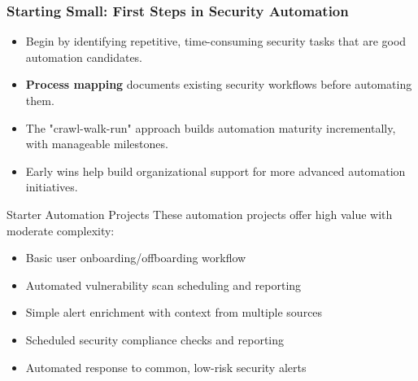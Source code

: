 \documentclass{beamer}
\begin{document}
\begin{frame}
  \frametitle{Starting Small: First Steps in Security Automation}
  
  \begin{itemize}
    \item Begin by identifying repetitive, time-consuming security tasks that are good automation candidates.
    \item \textbf{Process mapping} documents existing security workflows before automating them.
    \item The "crawl-walk-run" approach builds automation maturity incrementally, with manageable milestones.
    \item Early wins help build organizational support for more advanced automation initiatives.
  \end{itemize}
  
  \begin{exampleblock}{Starter Automation Projects}
    \scriptsize
    These automation projects offer high value with moderate complexity:
    \begin{itemize}
      \item Basic user onboarding/offboarding workflow
      \item Automated vulnerability scan scheduling and reporting
      \item Simple alert enrichment with context from multiple sources
      \item Scheduled security compliance checks and reporting
      \item Automated response to common, low-risk security alerts
    \end{itemize}
  \end{exampleblock}
\end{frame}
\end{document}
